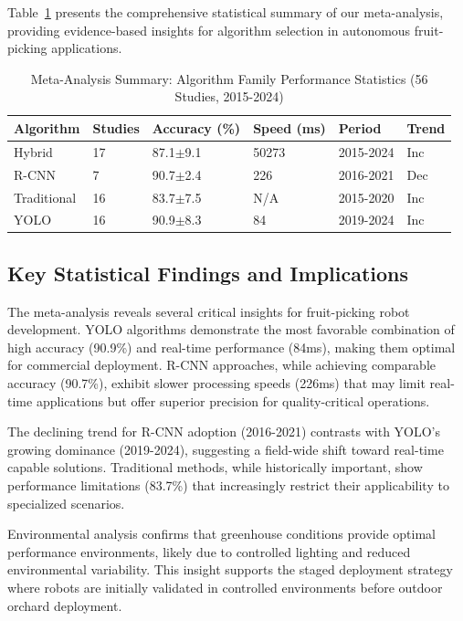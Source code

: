 \documentclass[pdflatex,sn-mathphys-num]{sn-jnl}
\begin{document}
Table~\ref{tab:meta_analysis_summary} presents the comprehensive statistical summary of our meta-analysis, providing evidence-based insights for algorithm selection in autonomous fruit-picking applications.

\begin{table}[htbp]
\centering
\small
\caption{Meta-Analysis Summary: Algorithm Family Performance Statistics (56 Studies, 2015-2024)}
\label{tab:meta_analysis_summary}
\renewcommand{\arraystretch}{1.3}
\begin{tabular}{p{2cm}p{1.5cm}p{2cm}p{2cm}p{1.5cm}p{2cm}}
\toprule
\textbf{Algorithm} & \textbf{Studies} & \textbf{Accuracy (\%)} & \textbf{Speed (ms)} & \textbf{Period} & \textbf{Trend} \\
\midrule
Hybrid & 17 & 87.1$\pm$9.1 & 50273 & 2015-2024 & Inc \\
R-CNN & 7 & 90.7$\pm$2.4 & 226 & 2016-2021 & Dec \\
Traditional & 16 & 83.7$\pm$7.5 & N/A & 2015-2020 & Inc \\
YOLO & 16 & 90.9$\pm$8.3 & 84 & 2019-2024 & Inc \\
\bottomrule
\end{tabular}
\end{table}

\subsection{Key Statistical Findings and Implications}
The meta-analysis reveals several critical insights for fruit-picking robot development. YOLO algorithms demonstrate the most favorable combination of high accuracy (90.9\%) and real-time performance (84ms), making them optimal for commercial deployment. R-CNN approaches, while achieving comparable accuracy (90.7\%), exhibit slower processing speeds (226ms) that may limit real-time applications but offer superior precision for quality-critical operations.

The declining trend for R-CNN adoption (2016-2021) contrasts with YOLO's growing dominance (2019-2024), suggesting a field-wide shift toward real-time capable solutions. Traditional methods, while historically important, show performance limitations (83.7\%) that increasingly restrict their applicability to specialized scenarios.

Environmental analysis confirms that greenhouse conditions provide optimal performance environments, likely due to controlled lighting and reduced environmental variability. This insight supports the staged deployment strategy where robots are initially validated in controlled environments before outdoor orchard deployment.
\end{document}
